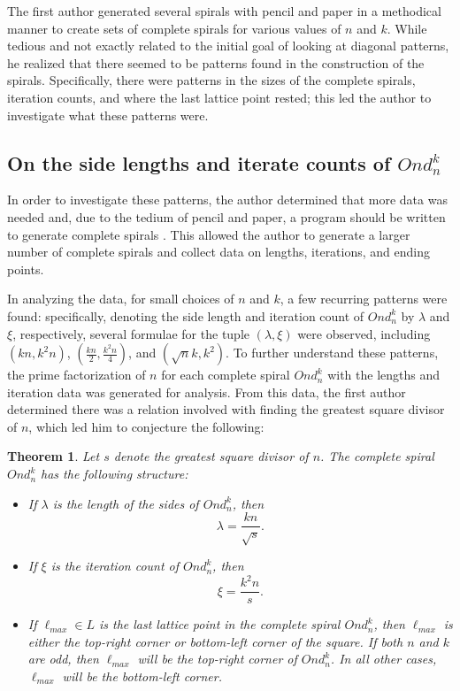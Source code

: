 \documentclass{article}
\newtheorem{theorem}{Theorem}
\theoremstyle{definition}
\begin{document}
The first author generated several spirals with pencil and paper in a
methodical manner to create sets of complete spirals for various
values of $n$ and $k$.  While tedious and not exactly related to the
initial goal of looking at diagonal patterns, he realized that there
seemed to be patterns found in the construction of the spirals.
Specifically, there were patterns in the sizes of the complete
spirals, iteration counts, and where the last lattice point rested;
this led the author to investigate what these patterns were.

\subsection{On the side lengths and iterate counts of $Ond^k_n$}

In order to investigate these patterns, the author determined that
more data was needed and, due to the tedium of pencil and paper, a
program should be written to generate complete spirals
\cite{PySquare}.  This allowed the author to generate a larger number
of complete spirals and collect data on lengths, iterations, and
ending points.

In analyzing the data, for small choices of $n$ and $k$, a few
recurring patterns were found: specifically, denoting the side length
and iteration count of $Ond^k_n$ by $\lambda$ and $\xi$, respectively,
several formulae for the tuple $(\lambda,\xi)$ were observed,
including $(kn, k^2 n)$, $(\frac{kn}{2}, \frac{k^2 n}{4})$, and
$(\sqrt{n}k, k^2)$.  To further understand these patterns, the prime
factorization of $n$ for each complete spiral $Ond^k_n$ with the
lengths and iteration data was generated for analysis.  From this
data, the first author determined there was a relation involved with
finding the greatest square divisor of $n$, which led him to
conjecture the following:

\begin{theorem}%
\label{lenthm}
Let $s$ denote the greatest square divisor of $n$.
The complete spiral $Ond^k_n$ has the following structure:
\begin{itemize}
\item If $\lambda$ is the length of the sides of $Ond^k_n$, then
\begin{equation}
  \lambda = \frac{kn}{\sqrt{s}}.
\label{lambda}
\end{equation}
\item If $\xi$ is the iteration count of $Ond^k_n$, then
\begin{equation}
  \xi = \frac{k^2n}{s}.  
\label{xi}
\end{equation}
\item If $\ell_{max} \in L$ is the last lattice point in the complete
  spiral $Ond^k_n$, then $\ell_{max}$ is either the top-right corner or
  bottom-left corner of the square.  If both $n$ and $k$ are odd, then
  $\ell_{max}$ will be the top-right corner of $Ond^k_n$.  In all other
  cases, $\ell_{max}$ will be the bottom-left corner.
\end{itemize}
\end{theorem}
\end{document}
